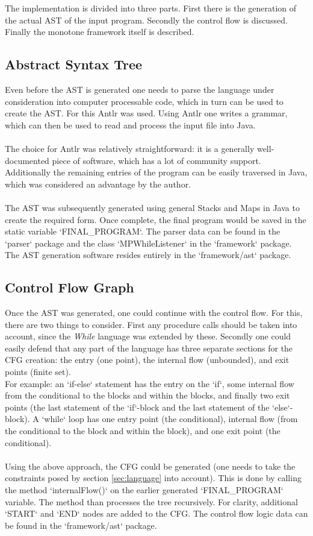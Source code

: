 \documentclass[paper=a4, fontsize=11pt]{scrartcl} %
\numberwithin{equation}{section} %
\numberwithin{figure}{section} %
\numberwithin{table}{section} %
\begin{document}
The implementation is divided into three parts.
First there is the generation of the actual AST of the input program.
Secondly the control flow is discussed.
Finally the monotone framework itself is described.

\subsection{Abstract Syntax Tree}

Even before the AST is generated one needs to parse the language under consideration into computer processable code, which in turn can be used to create the AST.
For this Antlr \cite{antlr} was used.
Using Antlr one writes a grammar, which can then be used to read and process the input file into Java.
\\
\\
The choice for Antlr was relatively straightforward:
it is a generally well-documented piece of software, which has a lot of community support.
Additionally the remaining entries of the program can be easily traversed in Java,
which was considered an advantage by the author.
\\
\\
The AST was subsequently generated using general Stacks and Maps in Java to create the required form.
Once complete, the final program would be saved in the static variable `FINAL\_PROGRAM`.
The parser data can be found in the `parser` package and the class `MPWhileListener` in the `framework` package.
The AST generation software resides entirely in the `framework/ast` package.

\subsection{Control Flow Graph}

Once the AST was generated, one could continue with the control flow.
For this, there are two things to consider.
First any procedure calls should be taken into account, since the \textit{While} language was extended by these.
Secondly one could easily defend that any part of the language has three separate sections for the CFG creation:
the entry (one point),
the internal flow (unbounded),
and exit points (finite set).
\\
For example: an `if-else` statement has the entry on the `if`, some internal flow from the conditional to the blocks and within the blocks, and finally two exit points (the last statement of the `if`-block and the last statement of the `else`-block).
A `while` loop has one entry point (the conditional), internal flow (from the conditional to the block and within the block), and one exit point (the conditional).
\\
\\
Using the above approach, the CFG could be generated (one needs to take the constraints posed by section \ref{sec:language} into account).
This is done by calling the method `internalFlow()` on the earlier generated `FINAL\_PROGRAM` variable. The method than processes the tree recursively.
For clarity, additional `START` and `END` nodes are added to the CFG.
The control flow logic data can be found in the `framework/ast` package.
\end{document}
